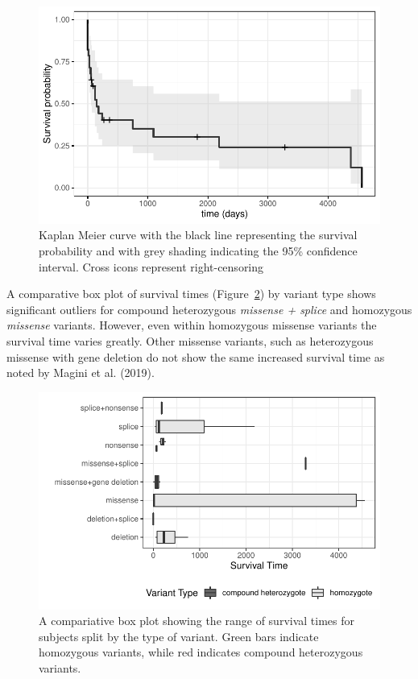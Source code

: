 \documentclass[
  letterpaper,
  DIV=11,
  numbers=noendperiod]{scrartcl}
\begin{document}
\begin{figure}

{\centering \includegraphics{paper_files/figure-pdf/fig-surv-1.pdf}

}

\caption{\label{fig-surv}Kaplan Meier curve with the black line
representing the survival probability and with grey shading indicating
the 95\% confidence interval. Cross icons represent right-censoring}

\end{figure}

A comparative box plot of survival times (Figure~\ref{fig-box}) by
variant type shows significant outliers for compound heterozygous
\emph{missense + splice} and homozygous \emph{missense} variants.
However, even within homozygous missense variants the survival time
varies greatly. Other missense variants, such as heterozygous missense
with gene deletion do not show the same increased survival time as noted
by Magini et al. (2019).

\begin{figure}

{\centering \includegraphics{paper_files/figure-pdf/fig-box-1.pdf}

}

\caption{\label{fig-box}A compariative box plot showing the range of
survival times for subjects split by the type of variant. Green bars
indicate homozygous variants, while red indicates compound heterozygous
variants.}

\end{figure}
\end{document}
